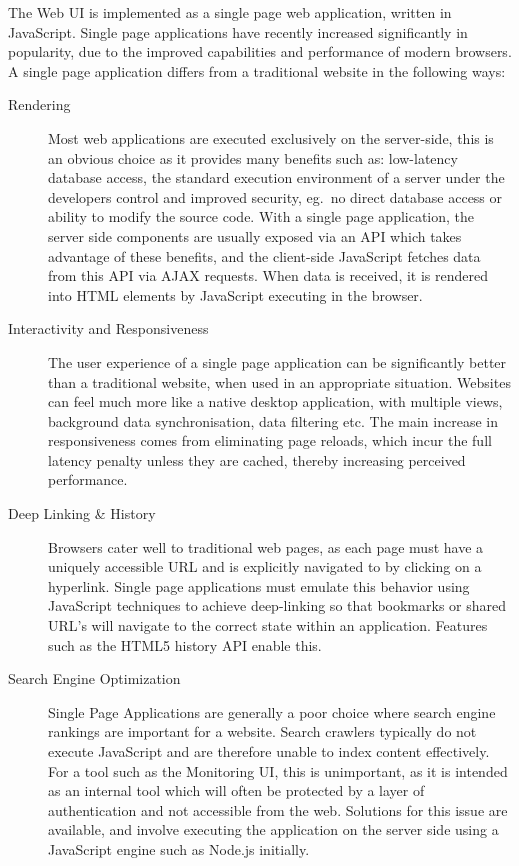 \documentclass{cshonours}
\begin{document}
The Web UI is implemented as a single page web application, written in JavaScript. Single page applications have recently increased significantly in popularity, due to the improved capabilities and performance of modern browsers. A single page application differs from a traditional website in the following ways:

\begin{description}
  \item[Rendering]
    Most web applications are executed exclusively on the server-side, this is an obvious choice as it provides many benefits such as: low-latency database access, the standard execution environment of a server under the developers control and improved security, eg.\ no direct database access or ability to modify the source code. With a single page application, the server side components are usually exposed via an API which takes advantage of these benefits, and the client-side JavaScript fetches data from this API via AJAX requests. When data is received, it is rendered into HTML elements by JavaScript executing in the browser.
  \item[Interactivity and Responsiveness]
    The user experience of a single page application can be significantly better than a traditional website, when used in an appropriate situation. Websites can feel much more like a native desktop application, with multiple views, background data synchronisation, data filtering etc. The main increase in responsiveness comes from eliminating page reloads, which incur the full latency penalty unless they are cached, thereby increasing perceived performance.
  \item[Deep Linking \& History]
    Browsers cater well to traditional web pages, as each page must have a uniquely accessible URL and is explicitly navigated to by clicking on a hyperlink. Single page applications must emulate this behavior using JavaScript techniques to achieve deep-linking so that bookmarks or shared URL's will navigate to the correct state within an application. Features such as the HTML5 history API enable this.
  \item[Search Engine Optimization]
    Single Page Applications are generally a poor choice where search engine rankings are important for a website. Search crawlers typically do not execute JavaScript and are therefore unable to index content effectively. For a tool such as the Monitoring UI, this is unimportant, as it is intended as an internal tool which will often be protected by a layer of authentication and not accessible from the web. Solutions for this issue are available, and involve executing the application on the server side using a JavaScript engine such as Node.js initially.

\end{description}
\end{document}
